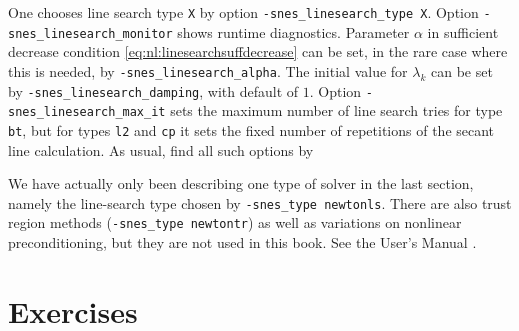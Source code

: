 One chooses line search type \texttt{X} by option \texttt{-snes\_linesearch\_type X}.  Option \texttt{-snes\_linesearch\_monitor} shows runtime diagnostics.  Parameter $\alpha$ in sufficient decrease condition \eqref{eq:nl:linesearchsuffdecrease} can be set, in the rare case where this is needed, by \texttt{-snes\_linesearch\_alpha}.  The initial value for $\lambda_k$ can be set by \texttt{-snes\_linesearch\_damping}, with default of $1$.  Option \texttt{-snes\_linesearch\_max\_it} sets the maximum number of line search tries for type \texttt{bt}, but for types \texttt{l2} and \texttt{cp} it sets the fixed number of repetitions of the secant line calculation.  As usual, find all such options by

We have actually only been describing one type of \pSNES solver in the last section, namely the line-search \pSNES type chosen by \texttt{-snes\_type newtonls}.  There are also trust region methods \citep{NocedalWright2006} (\texttt{-snes\_type newtontr}) as well as variations on nonlinear preconditioning, but they are not used in this book.  See the \PETSc User's Manual \citep{petsc-user-ref}.


\section{Exercises}


